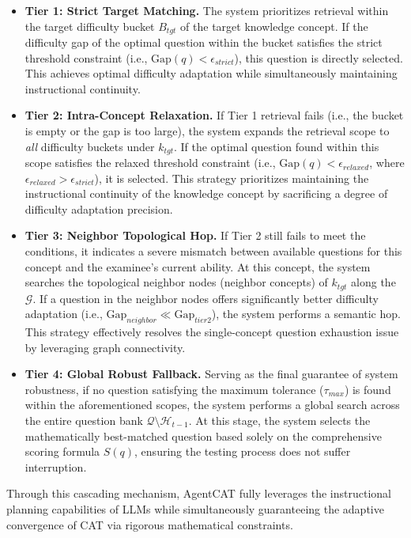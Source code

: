 \begin{itemize}
    \item \textbf{Tier 1: Strict Target Matching.} The system prioritizes retrieval within the target difficulty bucket $B_{tgt}$ of the target knowledge concept. If the difficulty gap of the optimal question within the bucket satisfies the strict threshold constraint (i.e., $\text{Gap}(q) < \epsilon_{strict}$), this question is directly selected. This achieves optimal difficulty adaptation while simultaneously maintaining instructional continuity.
    \item \textbf{Tier 2: Intra-Concept Relaxation.} If Tier 1 retrieval fails (i.e., the bucket is empty or the gap is too large), the system expands the retrieval scope to \textit{all} difficulty buckets under $k_{tgt}$. If the optimal question found within this scope satisfies the relaxed threshold constraint (i.e., $\text{Gap}(q) < \epsilon_{relaxed}$, where $\epsilon_{relaxed} > \epsilon_{strict}$), it is selected. This strategy prioritizes maintaining the instructional continuity of the knowledge concept by sacrificing a degree of difficulty adaptation precision.
    \item \textbf{Tier 3: Neighbor Topological Hop.} If Tier 2 still fails to meet the conditions, it indicates a severe mismatch between available questions for this concept and the examinee's current ability. At this concept, the system searches the topological neighbor nodes (neighbor concepts) of $k_{tgt}$ along the  $\mathcal{G}$\cite{huang2021knowledge}. If a question in the neighbor nodes offers significantly better difficulty adaptation (i.e., $\text{Gap}_{neighbor} \ll \text{Gap}_{tier2}$), the system performs a semantic hop. This strategy effectively resolves the single-concept question exhaustion issue by leveraging graph connectivity.
    \item \textbf{Tier 4: Global Robust Fallback.} Serving as the final guarantee of system robustness, if no question satisfying the maximum tolerance ($\tau_{max}$) is found within the aforementioned scopes, the system performs a global search across the entire question bank $\mathcal{Q} \setminus \mathcal{H}_{t-1}$. At this stage, the system selects the mathematically best-matched question based solely on the comprehensive scoring formula $S(q)$, ensuring the testing process does not suffer interruption.
\end{itemize}

Through this cascading mechanism, AgentCAT fully leverages the instructional planning capabilities of LLMs while simultaneously guaranteeing the adaptive convergence of CAT via rigorous mathematical constraints.

